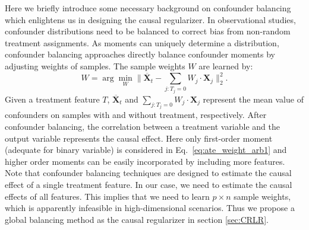\documentclass[sigconf]{acmart}
\begin{document}
Here we briefly introduce some necessary background on confounder balancing which enlightens us in designing the causal regularizer.
In observational studies, confounder distributions need to be balanced to correct bias from non-random treatment assignments. 
As moments can uniquely determine a distribution, confounder balancing approaches directly balance confounder moments by adjusting weights of samples\cite{hainmueller2011entropy,athey2016approximate,Kuang2017Estimating}. 
The sample weights $W$ are learned by:
\begin{equation}
    \label{eq:ate_weight_arb1}
    {W = \arg \min_{W} \|\overline{\bm{X}}_t - \sum_{j:T_j=0}W_j\cdot \bm{X}_j\|^{2}_2.}
\end{equation}
Given a treatment feature $T$, $\overline{\bm{X}}_t$ and $\sum_{j:T_j=0}W_j\cdot \bm{X}_j$ represent the mean value of confounders on samples with and without treatment, respectively.
After confounder balancing, the correlation between a treatment variable and the output variable represents the causal effect.
Here only first-order moment (adequate for binary variable) is considered in Eq.~\ref{eq:ate_weight_arb1} and higher order moments can be easily incorporated by including more features.
Note that confounder balancing techniques are designed to estimate the causal effect of a single treatment feature. 
In our case, we need to estimate the causal effects of all features. 
This implies that we need to learn $p \times n$ sample weights, which is apparently infeasible in high-dimensional scenarios. 
Thus we propose a global balancing method as the causal regularizer in section \ref{sec:CRLR}.
\end{document}
